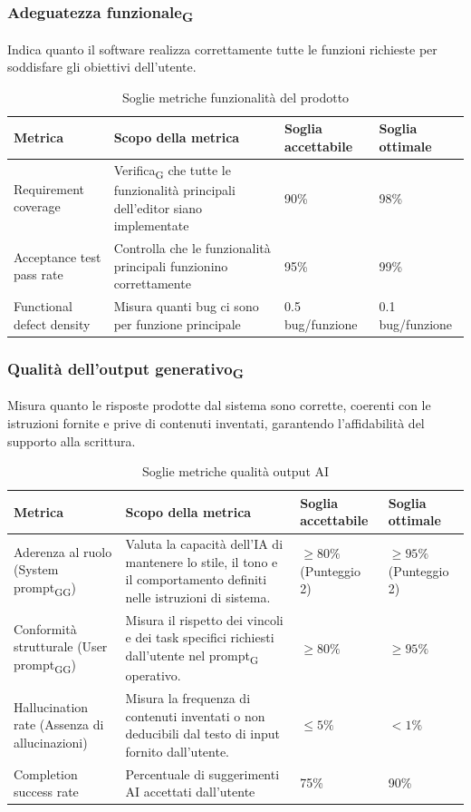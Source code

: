 \documentclass[11pt,a4paper]{article}
\newcommand{\gls}[1]{#1\textsubscript{G}}
\begin{document}
\subsubsection{\gls{Adeguatezza funzionale}}
Indica quanto il software realizza correttamente tutte le funzioni richieste per soddisfare gli obiettivi dell’utente.
\begin{table}[H]
\centering
\renewcommand{\arraystretch}{1.5}
\begin{tabular}{|M{0.25\textwidth}|M{0.35\textwidth}|M{0.15\textwidth}|M{0.15\textwidth}|}
\hline
\textbf{Metrica} & \textbf{Scopo della metrica} & \textbf{Soglia accettabile} & \textbf{Soglia ottimale} \\
\hline
Requirement coverage & \gls{Verifica} che tutte le funzionalità principali dell’editor siano implementate & 90\% & 98\% \\ \hline
Acceptance test pass rate & Controlla che le funzionalità principali funzionino correttamente & 95\% & 99\% \\
\hline
Functional defect density & Misura quanti bug ci sono per funzione principale & 0.5 bug/funzione & 0.1 bug/funzione \\
\hline
\end{tabular}
\caption{Soglie metriche funzionalità del prodotto}
\end{table}

\subsubsection{\gls{Qualità dell'output generativo}}
Misura quanto le risposte prodotte dal sistema sono corrette, coerenti con le istruzioni fornite e prive di contenuti inventati, garantendo l'affidabilità del supporto alla scrittura.

\begin{table}[H]
\centering
\renewcommand{\arraystretch}{1.5}
\begin{tabular}{|M{0.25\textwidth}|M{0.35\textwidth}|M{0.15\textwidth}|M{0.15\textwidth}|}
\hline
\textbf{Metrica} & \textbf{Scopo della metrica} & \textbf{Soglia accettabile} & \textbf{Soglia ottimale} \\
    \hline
    Aderenza al ruolo (\gls{System \gls{prompt}}) & Valuta la capacità dell'IA di mantenere lo stile, il tono e il comportamento definiti nelle istruzioni di sistema. & $\ge 80\%$ (Punteggio 2) & $\ge 95\%$ (Punteggio 2) \\
    \hline
    Conformità strutturale (\gls{User \gls{prompt}}) & Misura il rispetto dei vincoli e dei task specifici richiesti dall'utente nel \gls{prompt} operativo. & $\ge 80\%$ & $\ge 95\%$ \\
    \hline
    Hallucination rate (Assenza di allucinazioni) & Misura la frequenza di contenuti inventati o non deducibili dal testo di input fornito dall'utente. & $\le 5\%$ & $< 1\%$ \\
    \hline
    Completion success rate & Percentuale di suggerimenti AI accettati dall’utente & 75\% & 90\% \\
    \hline
\end{tabular}
\caption{Soglie metriche qualità output AI}
\end{table}
\end{document}
